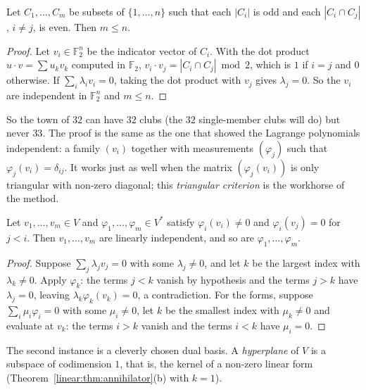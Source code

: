 \begin{theorem}\label{linear:thm:oddtown}
Let $C_1,\dots,C_m$ be subsets of $\{1,\dots,n\}$ such that each $|C_i|$ is odd and each $|C_i\cap C_j|$, $i\ne j$, is
even. Then $m\le n$.
\end{theorem}
\begin{proof}
Let $v_i\in\mathbb F_2^n$ be the indicator vector of $C_i$. With the dot product $u\cdot v=\sum u_kv_k$ computed in
$\mathbb F_2$, $v_i\cdot v_j=|C_i\cap C_j|\bmod2$, which is $1$ if $i=j$ and $0$ otherwise. If $\sum_i\lambda_iv_i=0$,
taking the dot product with $v_j$ gives $\lambda_j=0$. So the $v_i$ are independent in $\mathbb F_2^n$ and $m\le n$.
\end{proof}

So the town of $32$ can have $32$ clubs (the $32$ single-member clubs will do) but never $33$. The proof is the same
as the one that showed the Lagrange polynomials independent: a family $(v_i)$ together with measurements $(\varphi_j)$
such that $\varphi_j(v_i)=\delta_{ij}$. It works just as well when the matrix $(\varphi_j(v_i))$ is only triangular with
non-zero diagonal; this \emph{triangular criterion} is the workhorse of the method.

\begin{proposition}\label{linear:prop:triangular}
Let $v_1,\dots,v_m\in V$ and $\varphi_1,\dots,\varphi_m\in V^*$ satisfy $\varphi_i(v_i)\ne0$ and $\varphi_i(v_j)=0$ for $j<i$.
Then $v_1,\dots,v_m$ are linearly independent, and so are $\varphi_1,\dots,\varphi_m$.
\end{proposition}
\begin{proof}
Suppose $\sum_j\lambda_jv_j=0$ with some $\lambda_j\ne0$, and let $k$ be the largest index with $\lambda_k\ne0$. Apply
$\varphi_k$: the terms $j<k$ vanish by hypothesis and the terms $j>k$ have $\lambda_j=0$, leaving
$\lambda_k\varphi_k(v_k)=0$, a contradiction. For the forms, suppose $\sum_i\mu_i\varphi_i=0$ with some $\mu_i\ne0$, let $k$
be the smallest index with $\mu_k\ne0$ and evaluate at $v_k$: the terms $i>k$ vanish and the terms $i<k$ have $\mu_i=0$.
\end{proof}

The second instance is a cleverly chosen dual basis. A \emph{hyperplane} of $V$ is a subspace of codimension $1$, that is,
the kernel of a non-zero linear form (Theorem~\ref{linear:thm:annihilator}(b) with $k=1$).

